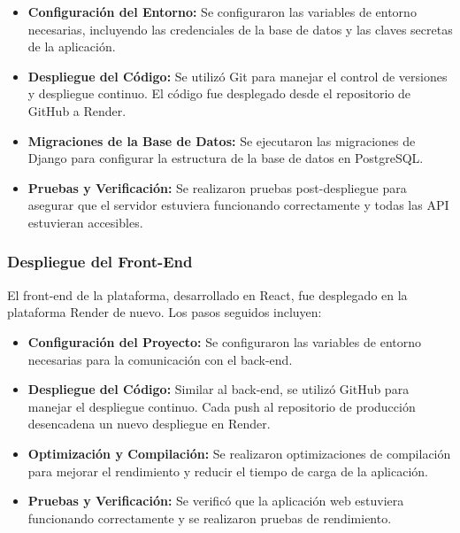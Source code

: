 \begin{itemize}
    \item \textbf{Configuración del Entorno:} Se configuraron las variables de entorno necesarias, incluyendo las credenciales de la base de datos y las claves secretas de la aplicación.
    \item \textbf{Despliegue del Código:} Se utilizó Git para manejar el control de versiones y despliegue continuo. El código fue desplegado desde el repositorio de GitHub a Render.
    \item \textbf{Migraciones de la Base de Datos:} Se ejecutaron las migraciones de Django para configurar la estructura de la base de datos en PostgreSQL.
    \item \textbf{Pruebas y Verificación:} Se realizaron pruebas post-despliegue para asegurar que el servidor estuviera funcionando correctamente y todas las API estuvieran accesibles.
\end{itemize}

\subsubsection{Despliegue del Front-End}
El front-end de la plataforma, desarrollado en React, fue desplegado en la plataforma Render de nuevo. Los pasos seguidos incluyen:

\begin{itemize}
    \item \textbf{Configuración del Proyecto:} Se configuraron las variables de entorno necesarias para la comunicación con el back-end.
    \item \textbf{Despliegue del Código:} Similar al back-end, se utilizó GitHub para manejar el despliegue continuo. Cada push al repositorio de producción desencadena un nuevo despliegue en Render.
    \item \textbf{Optimización y Compilación:} Se realizaron optimizaciones de compilación para mejorar el rendimiento y reducir el tiempo de carga de la aplicación.
    \item \textbf{Pruebas y Verificación:} Se verificó que la aplicación web estuviera funcionando correctamente y se realizaron pruebas de rendimiento.
\end{itemize}